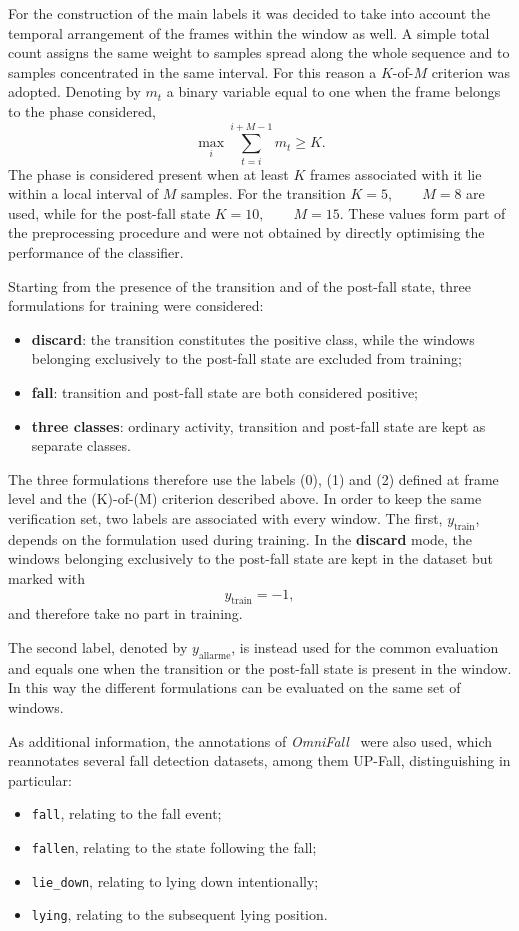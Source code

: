 For the construction of the main labels it was decided to take into account the temporal arrangement of the frames within the window as well. A simple total count assigns the same weight to samples spread along the whole sequence and to samples concentrated in the same interval. For this reason a $K$-of-$M$ criterion was adopted. Denoting by $m_t$ a binary variable equal to one when the frame belongs to the phase considered,
\[
\max_i \sum_{t=i}^{i+M-1} m_t \geq K.
\]
The phase is considered present when at least $K$ frames associated with it lie within a local interval of $M$ samples.
For the transition $K=5, \qquad M=8$ are used, while for the post-fall state $K = 10, \qquad M = 15$. These values form part of the preprocessing procedure and were not obtained by directly optimising the performance of the classifier.

Starting from the presence of the transition and of the post-fall state, three formulations for training were considered:
\begin{itemize}
\item \textbf{discard}: the transition constitutes the positive class, while the windows belonging exclusively to the post-fall state are excluded from training;
\item \textbf{fall}: transition and post-fall state are both considered positive;
\item \textbf{three classes}: ordinary activity, transition and post-fall state are kept as separate classes. \end{itemize}

The three formulations therefore use the labels (0), (1) and (2) defined at frame level and the (K)-of-(M) criterion described above. In order to keep the same verification set, two labels are associated with every window. The first, $y_{\text{train}}$, depends on the formulation used during training. In the \textbf{discard} mode, the windows belonging exclusively to the post-fall state are kept in the dataset but marked with
\[
y_{\text{train}}=-1,
\]
and therefore take no part in training.

The second label, denoted by $y_{\text{allarme}}$, is instead used for the common evaluation and equals one when the transition or the post-fall state is present in the window. In this way the different formulations can be evaluated on the same set of windows.

As additional information, the annotations of \emph{OmniFall}~\cite{SN} were also used, which reannotates several fall detection datasets, among them UP-Fall, distinguishing in particular:
\begin{itemize}
    \item \texttt{fall}, relating to the fall event;
    \item \texttt{fallen}, relating to the state following the fall;
    \item \texttt{lie\_down}, relating to lying down intentionally;
    \item \texttt{lying}, relating to the subsequent lying position.
\end{itemize}


